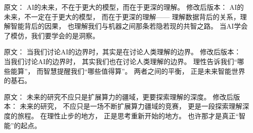 原文：
AI的未来，不在于更大的模型，而在于更深的理解。
修改后版本：
AI的未来，不一定在于更大的模型，  
而在于更深的理解——  
理解数据背后的关系，理解智能背后的因果，  
也理解我们与机器之间那条若隐若现的共智之路。  
当AI学会了模仿，我们要学会的是洞察。



原文：
当我们讨论AI的边界时，其实是在讨论人类理解的边界。
修改后版本：
当我们讨论AI的边界时，  
其实我们也在讨论人类理解的边界。  
理性告诉我们“哪些能算”，  
而智慧提醒我们“哪些值得算”。  
两者之间的平衡，  
正是未来智能世界的基石。



原文：
未来的研究不应只是扩展算力的疆域，更要探索理解的深度。
修改后版本：
未来的研究，  
不应只是一场不断扩展算力疆域的竞赛，  
更是一段探索理解深度的旅程。  
在理性止步的地方，  
正是思考重新开始的地方。  
也许那才是真正“智能”的起点。




